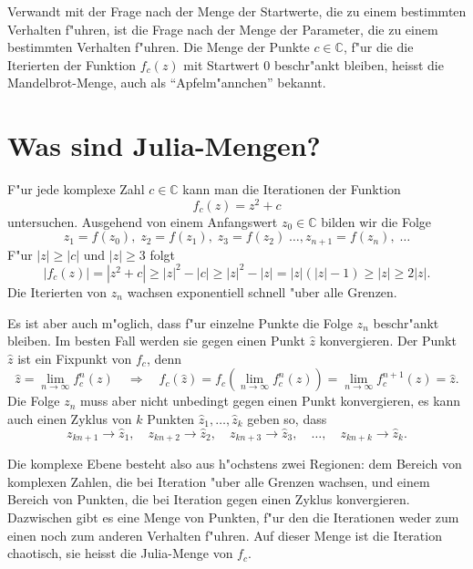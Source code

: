 \begin{refsection}
Verwandt mit der Frage nach der Menge der Startwerte, die zu einem
bestimmten Verhalten f"uhren, ist die Frage nach der Menge der Parameter,
die zu einem bestimmten Verhalten f"uhren.
Die Menge der Punkte $c\in\mathbb C$, f"ur die die Iterierten der
Funktion $f_c(z)$ mit Startwert $0$ beschr"ankt bleiben, heisst die
Mandelbrot-Menge, auch als ``Apfelm"annchen'' bekannt.

\section{Was sind Julia-Mengen?}
F"ur jede komplexe Zahl $c\in\mathbb C$ kann man die Iterationen der
Funktion
\begin{equation}
f_c(z)=z^2 + c
\label{julia:quadratic}
\end{equation}
untersuchen.
Ausgehend von einem Anfangswert $z_0\in\mathbb C$ bilden wir die Folge
\[
z_1=f(z_0),\;z_2=f(z_1),\;z_3=f(z_2)\;\dots, z_{n+1}=f(z_n),\;\dots
\]
F"ur $|z|\ge |c|$ und $|z|\ge 3$ folgt
\[
|f_c(z)|= |z^2+c|\ge |z|^2-|c|\ge |z|^2-|z|=|z|(|z|-1)\ge |z|\ge 2|z|.
\]
Die Iterierten von $z_n$ wachsen exponentiell schnell "uber alle Grenzen.

Es ist aber auch m"oglich, dass f"ur einzelne Punkte die Folge $z_n$ 
beschr"ankt bleiben. Im besten Fall werden sie gegen einen Punkt
$\hat z$ konvergieren.
Der Punkt $\hat z$ ist ein Fixpunkt von $f_c$, denn
\[
\hat z = \lim_{n\to \infty}f_c^{n}(z)\quad\Rightarrow\quad
f_c(\hat z)=f_c(\lim_{n\to\infty}f_c^n(z))=\lim_{n\to\infty}f_c^{n+1}(z)=\hat z.
\]
Die Folge $z_n$ muss aber nicht unbedingt gegen einen Punkt konvergieren,
es kann auch einen Zyklus von $k$ Punkten $\hat z_1,\dots,\hat z_k$ geben
so, dass
\[
z_{kn+1}\to \hat z_1,\quad
z_{kn+2}\to \hat z_2,\quad
z_{kn+3}\to \hat z_3,\quad\dots,\quad
z_{kn+k}\to \hat z_k.
\]

Die komplexe Ebene besteht also aus h"ochstens zwei Regionen: dem Bereich
von komplexen Zahlen, die bei Iteration "uber alle Grenzen wachsen, und
einem Bereich von Punkten, die bei Iteration gegen einen Zyklus konvergieren.
Dazwischen gibt es eine Menge von Punkten, f"ur den die Iterationen weder
zum einen noch zum anderen Verhalten f"uhren.
Auf dieser Menge ist die Iteration chaotisch, sie
heisst die Julia-Menge von $f_c$.


\end{refsection}
